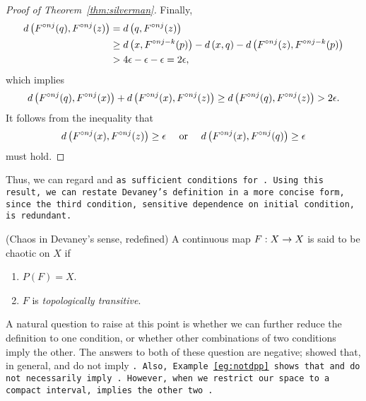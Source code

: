 \documentclass[12pt,draft,twoside]{book}
\begin{document}
\begin{proof}[Proof of Theorem~\ref{thm:silverman}]
    Finally, 
    \begin{align*}
      d\left( F^{\circ nj}(q), F^{\circ nj}(z) \right) 
      &= d\left( q, F^{\circ nj}(z) \right)  \\
      &\geq  d\left( x, F^{\circ nj-k}(p) \right) - d\left( x,q \right) - d\left( F^{\circ nj}(z), F^{\circ nj - k}(p) \right)  \\
      &> 4\epsilon - \epsilon - \epsilon 
      = 2\epsilon,
    \end{align*}
    which implies
    \begin{equation*}
      d\left( F^{\circ nj}(q), F^{\circ nj}(x) \right) + d\left( F^{\circ nj}(x), F^{\circ nj}(z) \right) 
      \geq d\left( F^{\circ nj}(q), F^{\circ nj}(z) \right)
      > 2\epsilon.
    \end{equation*}
    It follows from the inequality that 
    \begin{equation*}
      d\left( F^{\circ nj}(x), F^{\circ nj}(z) \right) \geq \epsilon \quad\mbox{ or }\quad d\left( F^{\circ nj}(x), F^{\circ nj}(q) \right) \geq \epsilon 
    \end{equation*}
    must hold.
  \end{proof}

  Thus, we can regard \dpp and \tt as sufficient conditions for \sdic.
  Using this result, we can restate Devaney's definition in a more concise form, since the third condition, sensitive dependence on initial condition, is redundant.
  \begin{definition}
    (Chaos in Devaney's sense, redefined) 
    A continuous map $F: X\rightarrow X$ is said to be chaotic on $X$ if
    \begin{enumerate}
      \item $P(F) = X$.
      \item $F$ is \textit{topologically transitive}.
    \end{enumerate}
  \end{definition}
  A natural question to raise at this point is whether we can further reduce the definition to one condition, or whether other combinations of two conditions imply the other.
  The answers to both of these question are negative; \citet{assaf} showed that, in general, \dpp and \sdic do not imply \tt.
  Also, Example~\ref{eg:notdpp} shows that \sdic and \tt do not necessarily imply \dpp.
  However, when we restrict our space to a compact interval, \tt implies the other two \citep{silverman}.
\end{document}
